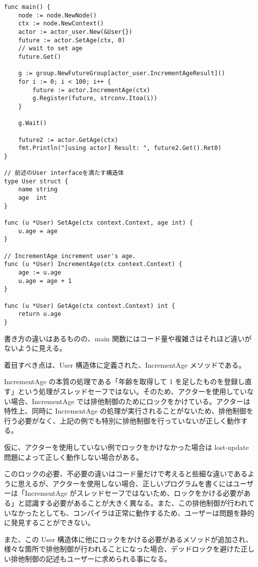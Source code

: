 \begin{verbatim}
func main() {
    node := node.NewNode()
    ctx := node.NewContext()
    actor := actor_user.New(&User{})
    future := actor.SetAge(ctx, 0)
    // wait to set age
    future.Get()

    g := group.NewFutureGroup[actor_user.IncrementAgeResult]()
    for i := 0; i < 100; i++ {
        future := actor.IncrementAge(ctx)
        g.Register(future, strconv.Itoa(i))
    }

    g.Wait()

    future2 := actor.GetAge(ctx)
    fmt.Println("[using actor] Result: ", future2.Get().Ret0)
}

// 前述のUser interfaceを満たす構造体
type User struct {
    name string
    age  int
}

func (u *User) SetAge(ctx context.Context, age int) {
    u.age = age
}

// IncrementAge increment user's age.
func (u *User) IncrementAge(ctx context.Context) {
    age := u.age
    u.age = age + 1
}

func (u *User) GetAge(ctx context.Context) int {
    return u.age
}
\end{verbatim}

書き方の違いはあるものの、main
関数にはコード量や複雑さはそれほど違いがないように見える。

着目すべき点は、User 構造体に定義された、IncrementAge メソッドである。

IncrementAge の本質の処理である「年齢を取得して 1
を足したものを登録し直す」という処理がスレッドセーフではない。そのため、アクターを使用していない場合、IncrementAge
では排他制御のためにロックをかけている。アクターは特性上、同時に
IncrementAge
の処理が実行されることがないため、排他制御を行う必要がなく、上記の例でも特別に排他制御を行っていないが正しく動作する。

仮に、アクターを使用していない例でロックをかけなかった場合は lost-update
問題によって正しく動作しない場合がある。

このロックの必要、不必要の違いはコード量だけで考えると些細な違いであるように思えるが、アクターを使用しない場合、正しいプログラムを書くにはユーザーは「IncrementAge
がスレッドセーフではないため、ロックをかける必要がある」と認識する必要があることが大きく異なる。また、この排他制御が行われていなかったとしても、コンパイラは正常に動作するため、ユーザーは問題を静的に発見することができない。

また、この User
構造体に他にロックをかける必要があるメソッドが追加され、様々な箇所で排他制御が行われることになった場合、デッドロックを避けた正しい排他制御の記述もユーザーに求められる事になる。

